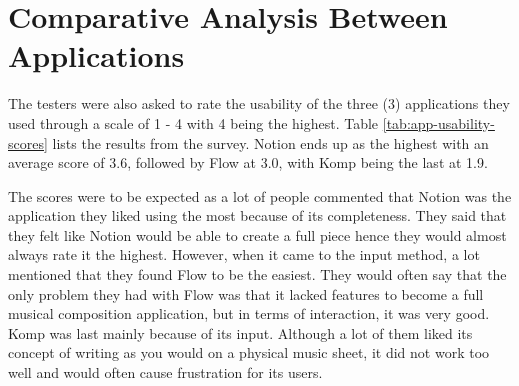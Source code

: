 	\section{Comparative Analysis Between Applications}

		The testers were also asked to rate the usability of the three (3) applications they used through a scale of 1 - 4 with 4 being the highest. Table \ref{tab:app-usability-scores} lists the results from the survey. Notion ends up as the highest with an average score of 3.6, followed by Flow at 3.0, with Komp being the last at 1.9.

		The scores were to be expected as a lot of people commented that Notion was the application they liked using the most because of its completeness. They said that they felt like Notion would be able to create a full piece hence they would almost always rate it the highest. However, when it came to the input method, a lot mentioned that they found Flow to be the easiest. They would often say that the only problem they had with Flow was that it lacked features to become a full musical composition application, but in terms of interaction, it was very good. Komp was last mainly because of its input. Although a lot of them liked its concept of writing as you would on a physical music sheet, it did not work too well and would often cause frustration for its users. 


